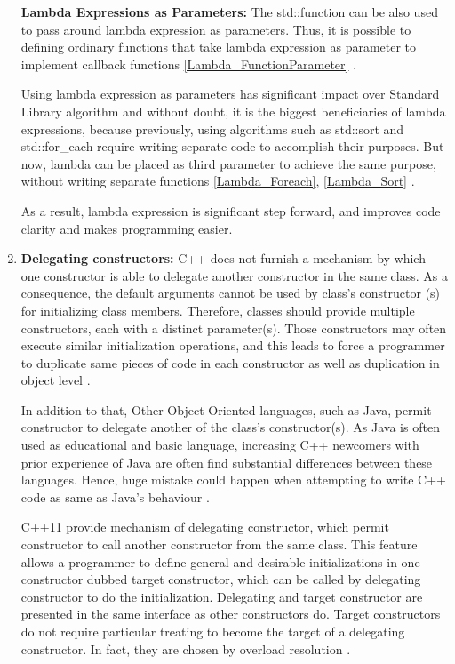 \documentclass[11pt]{report}
\begin{document}
\begin{enumerate}
\textbf{Lambda Expressions as Parameters:} The std::function can be also used to pass around lambda expression as parameters. Thus, it is possible to defining ordinary functions that take lambda expression as parameter to implement callback functions \ref{Lambda_FunctionParameter} \cite{Allain:2011:FutureCpp}.
\newline

Using lambda expression as parameters has significant impact over Standard Library algorithm and without doubt, it is the biggest beneficiaries of lambda expressions, because previously, using algorithms such as std::sort and std::for\_each require writing separate code to accomplish their purposes. But now, lambda can be placed as third parameter to achieve the same purpose, without writing separate functions \ref{Lambda_Foreach}, \ref{Lambda_Sort} \cite {Gregorie:professionalcpp}.
\newline

As a result, lambda expression is significant step forward, and improves code clarity and makes programming easier.

\item \textbf{Delegating constructors:} C++ does not furnish a mechanism by which one constructor is able to delegate another constructor in the same class.  As a consequence, the default arguments cannot be used by class's constructor (s) for initializing class members. Therefore, classes should provide multiple constructors, each with a distinct parameter(s). Those constructors may often execute similar initialization operations, and this leads to force a programmer to duplicate same pieces of code in each constructor as well as duplication in object level \cite{Overland:2011:CWF}.
\newline

In addition to that, Other Object Oriented languages, such as Java, permit constructor to delegate another of the class's constructor(s).  As Java is often used as educational and basic language, increasing C++ newcomers with prior experience of Java are often find substantial differences between these languages. Hence, huge mistake could happen when attempting to write C++ code as same as Java's behaviour \cite{Overland:2011:CWF}.
\newline

C++11 provide mechanism of delegating constructor, which permit constructor to call another constructor from the same class. This feature allows a programmer to define general and desirable initializations in one constructor dubbed target constructor, which can be called by delegating constructor to do the initialization. Delegating and target constructor are presented in the same interface as other constructors do. Target constructors do not require particular treating to become the target of a delegating constructor. In fact, they are chosen by overload resolution \cite{Overland:2011:CWF}.
\newline


\end{enumerate}
\end{document}

